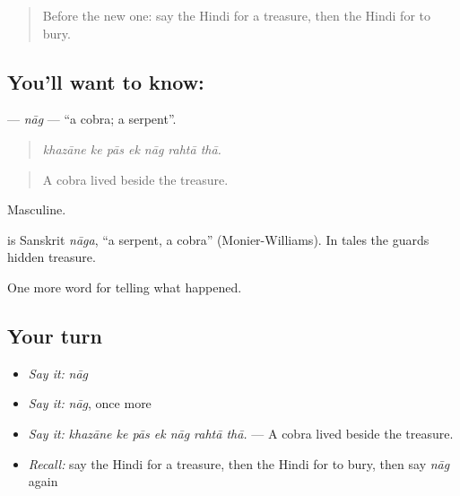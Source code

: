 \label{lesson:HI-C337-nag}



\begin{quote}
Before the new one: say the Hindi for a treasure, then the Hindi for to bury.
\end{quote}

\subsection*{You'll want to know: }
\textbf{} — \emph{nāg} — \textquotedblleft{}a cobra; a serpent\textquotedblright{}.

\begin{quote}
      
\end{quote}

\begin{quote}
\emph{khazāne ke pās ek nāg rahtā thā.}
\end{quote}

\begin{quote}
A cobra lived beside the treasure.
\end{quote}

Masculine.

\begin{cousinweb}
is Sanskrit \emph{nāga}, \textquotedblleft{}a serpent, a cobra\textquotedblright{} (Monier-Williams). In tales the \textbf{} guards hidden treasure.
\end{cousinweb}

\begin{grammarlens}[title={What you've built}]
One more word for telling what happened.
\end{grammarlens}

\subsection*{Your turn}
\begin{itemize}
\raggedright
  \item \emph{Say it:} \emph{nāg}
  \item \emph{Say it:} \emph{nāg}, once more
  \item \emph{Say it:} \emph{khazāne ke pās ek nāg rahtā thā.} — A cobra lived beside the treasure.
  \item \emph{Recall:} say the Hindi for a treasure, then the Hindi for to bury, then say \emph{nāg} again
\end{itemize}

